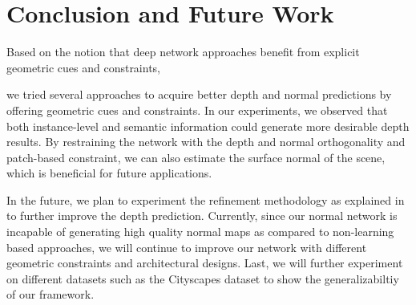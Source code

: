 \documentclass[10pt,twocolumn,letterpaper]{article}
\begin{document}
\section{Conclusion and Future Work}

Based on the notion that deep network approaches benefit from explicit geometric cues and constraints,

we tried several approaches to acquire better depth and normal predictions by offering geometric cues and constraints. In our experiments, we observed that both instance-level and semantic information could generate more desirable depth results. By restraining the network with the depth and normal orthogonality and patch-based constraint, we can also estimate the surface normal of the scene, which is beneficial for future applications. 

In the future, we plan to experiment the refinement methodology as explained in \cite{casser2018depth} to further improve the depth prediction. Currently, since our normal network is incapable of generating high quality normal maps as compared to non-learning based approaches, we will continue to improve our network with different geometric constraints and architectural designs. Last, we will further experiment on different datasets such as the Cityscapes dataset to show the generalizabiltiy of our framework.









{\small


}
\end{document}
